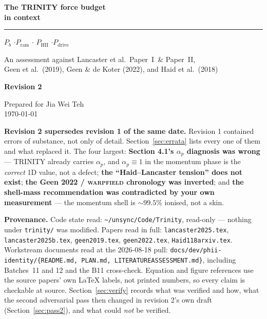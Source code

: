 \documentclass[11pt,a4paper,oneside]{report}
\newcommand{\brkus}{\textunderscore\allowbreak}
\newcommand{\code}[1]{\texttt{\small\let\_\brkus #1}}
\newcommand{\PI}{Paper~I}
\newcommand{\PII}{Paper~II}
\newcommand{\ap}{\alpha_p}
\newcommand{\up}[1]{\textcolor{tqaccent}{\textbf{#1}}}
\begin{document}
\setcounter{chapter}{0}

\thispagestyle{empty}
\begin{center}
  \vspace*{2.0cm}
  {\sffamily\bfseries\Huge\color{tqink} The TRINITY force budget\\[4pt] in context\par}
  \vspace{10pt}
  {\color{tqrule}\rule{0.55\textwidth}{1.1pt}}\par
  \vspace{12pt}
  {\sffamily\large\color{tqaccent}
   $P_b$ \quad$\cdot$\quad $P_{\mathrm{ram}}$ \quad$\cdot$\quad
   $P_{\mathrm{HII}}$ \quad$\cdot$\quad $P_{\mathrm{drive}}$\par}
  \vspace{22pt}
  {\sffamily\normalsize\color{tqink}
   An assessment against Lancaster et al.\ \PI\ \& \PII,\\
   Geen et al.\ (2019), Geen \& de Koter (2022), and Haid et al.\ (2018)\par}
  \vspace{18pt}
  {\sffamily\normalsize\bfseries\color{tqaccent} Revision 2\par}
  \vspace{26pt}
  {\sffamily\small\color{tqink}
   Prepared for Jia Wei Teh \\[3pt]
   \today\par}
\end{center}

\vfill
\begin{versionbox}
\small
\textbf{\sffamily Revision 2 supersedes revision 1 of the same date.}
Revision 1 contained errors of substance, not only of detail.
Section~\ref{sec:errata} lists every one of them and what replaced it.
The four largest: \up{Section 4.1's $\ap$ diagnosis was wrong} --- TRINITY already
carries $\ap$, and $\ap \equiv 1$ in the momentum phase is the \emph{correct} 1D value,
not a defect; \up{the ``Haid--Lancaster tension'' does not exist}; \up{the Geen 2022 /
\textsc{warpfield} chronology was inverted}; and \up{the shell-mass recommendation was
contradicted by your own measurement} --- the momentum shell is ${\sim}99.5\%$ ionised,
not a skin.

\medskip
\textbf{\sffamily Provenance.}
Code state read: \code{\textasciitilde/unsync/Code/Trinity}, read-only --- nothing under
\code{trinity/} was modified. Papers read in full:
\code{lancaster2025.tex}, \code{lancaster2025b.tex}, \code{geen2019.tex},
\code{geen2022.tex}, \code{Haid118\_arxiv.tex}.
Workstream documents read at the 2026-08-18 pull:
\code{docs/dev/phii-identity/\{README.md, PLAN.md, LITERATURE\_ASSESSMENT.md\}},
including Batches~11 and 12 and the B11 cross-check.
Equation and figure references use the source papers' own \LaTeX{} labels, not printed
numbers, so every claim is checkable at source.
Section~\ref{sec:verify} records what was verified and how, what the second adversarial pass then
changed in revision 2's own draft (Section~\ref{sec:pass2}), and what could \emph{not} be verified.
\end{versionbox}
\end{document}
